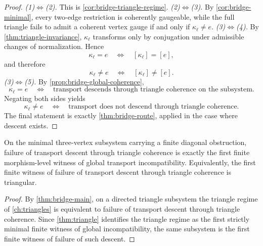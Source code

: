 \begin{proof}
	\emph{\textup{(1)}\(\Longleftrightarrow\)\textup{(2)}.}
	This is \cref{cor:bridge-triangle-regime}.
	\smallskip
	\noindent
	\emph{\textup{(2)}\(\Longleftrightarrow\)\textup{(3)}.}
	By \cref{cor:bridge-minimal}, every two-edge restriction is coherently
	gaugeable, while the full triangle fails to admit a coherent vertex
	gauge if and only if \(\kappa_\ell\neq e\).
	\smallskip
	\noindent
	\emph{\textup{(3)}\(\Longleftrightarrow\)\textup{(4)}.}
	By \cref{thm:triangle-invariance}, \(\kappa_\ell\) transforms only by
	conjugation under admissible changes of normalization. Hence
	\[
		\kappa_\ell=e
		\quad\Longleftrightarrow\quad
		[\kappa_\ell]=[e],
	\]
	and therefore
	\[
		\kappa_\ell\neq e
		\quad\Longleftrightarrow\quad
		[\kappa_\ell]\neq [e].
	\]
	\smallskip
	\noindent
	\emph{\textup{(3)}\(\Longleftrightarrow\)\textup{(5)}.}
	By \cref{prop:bridge-global-coherence},
	\[
		\kappa_\ell=e
		\quad\Longleftrightarrow\quad
		\text{transport descends through triangle coherence on the subsystem}.
	\]
	Negating both sides yields
	\[
		\kappa_\ell\neq e
		\quad\Longleftrightarrow\quad
		\text{transport does not descend through triangle coherence}.
	\]
	The final statement is exactly \cref{thm:bridge-route}, applied in the
	case where descent exists.
\end{proof}
\begin{corollary}
	On the minimal three-vertex subsystem carrying a finite diagonal
	obstruction, failure of transport descent through triangle coherence is
	exactly the first finite morphism-level witness of global transport
	incompatibility.
	Equivalently, the first finite witness of failure of transport descent
	through triangle coherence is triangular.
\end{corollary}
\begin{proof}
	By \cref{thm:bridge-main}, on a directed triangle subsystem the
	triangle regime of \cref{ch:triangles} is equivalent to failure of
	transport descent through triangle coherence. Since \cref{thm:triangle}
	identifies the triangle regime as the first strictly minimal finite
	witness of global incompatibility, the same subsystem is the first
	finite witness of failure of such descent.
\end{proof}
